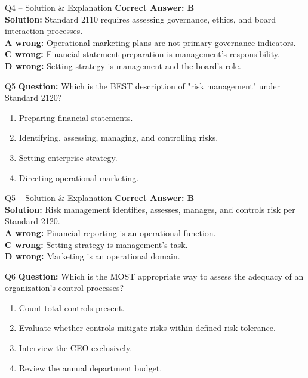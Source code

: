 \documentclass[aspectratio=169,10pt]{beamer}
\begin{document}
	\begin{frame}[t]{Q4 -- Solution \& Explanation}
		\small
		\textbf{Correct Answer: B} \\[4pt]
		\textbf{Solution:} Standard 2110 requires assessing governance, ethics, and board interaction processes. \\[4pt]
		\textbf{A wrong:} Operational marketing plans are not primary governance indicators. \\[2pt]
		\textbf{C wrong:} Financial statement preparation is management's responsibility. \\[2pt]
		\textbf{D wrong:} Setting strategy is management and the board's role.
	\end{frame}
	
	\begin{frame}[t]{Q5}
		\small
		\textbf{Question:} Which is the BEST description of "risk management" under Standard 2120?
		\begin{enumerate}[label=\Alph*.,itemsep=1pt,topsep=2pt]
			\item Preparing financial statements.
			\item Identifying, assessing, managing, and controlling risks.
			\item Setting enterprise strategy.
			\item Directing operational marketing.
		\end{enumerate}
	\end{frame}
	
	\begin{frame}[t]{Q5 -- Solution \& Explanation}
		\small
		\textbf{Correct Answer: B} \\[4pt]
		\textbf{Solution:} Risk management identifies, assesses, manages, and controls risk per Standard 2120. \\[4pt]
		\textbf{A wrong:} Financial reporting is an operational function. \\[2pt]
		\textbf{C wrong:} Setting strategy is management's task. \\[2pt]
		\textbf{D wrong:} Marketing is an operational domain.
	\end{frame}
	
	\begin{frame}[t]{Q6}
		\small
		\textbf{Question:} Which is the MOST appropriate way to assess the adequacy of an organization's control processes?
		\begin{enumerate}[label=\Alph*.,itemsep=1pt,topsep=2pt]
			\item Count total controls present.
			\item Evaluate whether controls mitigate risks within defined risk tolerance.
			\item Interview the CEO exclusively.
			\item Review the annual department budget.
		\end{enumerate}
	\end{frame}
	
\end{document}

